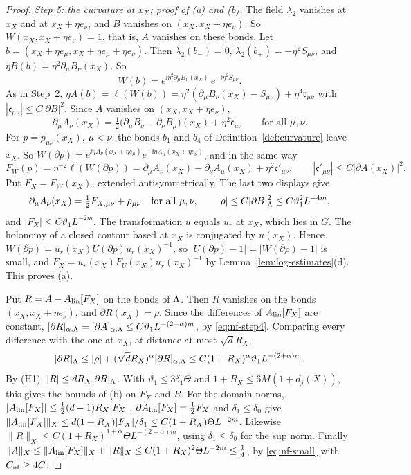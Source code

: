 \begin{proof}
\emph{Step 5: the curvature at $x_X$; proof of (a) and (b).} The field $\lambda_2$ vanishes at $x_X$ and at $x_X+\eta e_\nu$, and $B$ vanishes on $(x_X,x_X+\eta e_\nu)$. So $W(x_X,x_X+\eta e_\nu)=1$, that is, $A$ vanishes on these bonds. Let $b=(x_X+\eta e_\mu,x_X+\eta e_\mu+\eta e_\nu)$. Then $\lambda_2(b_-)=0$, $\lambda_2(b_+)=-\eta^2S_{\mu\nu}$, and $\eta B(b)=\eta^2\partial_\mu B_\nu(x_X)$. So
\[
W(b)=e^{\ii\eta^2\partial_\mu B_\nu(x_X)}\,e^{-\ii\eta^2S_{\mu\nu}} .
\]
As in Step~2, $\eta A(b)=\ell(W(b))=\eta^2(\partial_\mu B_\nu(x_X)-S_{\mu\nu})+\eta^4\mathfrak c_{\mu\nu}$ with $|\mathfrak c_{\mu\nu}|\le C|\partial B|^2$. Since $A$ vanishes on $(x_X,x_X+\eta e_\nu)$,
\[
\partial_\mu A_\nu(x_X)=\tfrac12\big(\partial_\mu B_\nu-\partial_\nu B_\mu\big)(x_X)+\eta^2\mathfrak c_{\mu\nu}\qquad\text{for all }\mu,\nu .
\]
For $p=p_{\mu\nu}(x_X)$, $\mu<\nu$, the bonds $b_1$ and $b_4$ of Definition~\ref{def:curvature} leave $x_X$. So $W(\partial p)=e^{\ii\eta A_\nu(x_X+\eta e_\mu)}e^{-\ii\eta A_\mu(x_X+\eta e_\nu)}$, and in the same way
\[
F_W(p)=\eta^{-2}\ell(W(\partial p))=\partial_\mu A_\nu(x_X)-\partial_\nu A_\mu(x_X)+\eta^2\mathfrak c'_{\mu\nu},\qquad|\mathfrak c'_{\mu\nu}|\le C|\partial A(x_X)|^2 .
\]
Put $F_X=F_W(x_X)$, extended antisymmetrically. The last two displays give
\[
\partial_\mu A_\nu(x_X)=\tfrac12F_{X,\mu\nu}+\rho_{\mu\nu}\quad\text{for all }\mu,\nu,\qquad|\rho|\le C|\partial B|_\Lambda^2\le C\vartheta_1^2L^{-4m},
\]
and $|F_X|\le C\vartheta_1L^{-2m}$. The transformation $u$ equals $u_r$ at $x_X$, which lies in $G$. The holonomy of a closed contour based at $x_X$ is conjugated by $u(x_X)$. Hence $W(\partial p)=u_r(x_X)U(\partial p)u_r(x_X)^{-1}$, so $|U(\partial p)-1|=|W(\partial p)-1|$ is small, and $F_X=u_r(x_X)F_U(x_X)u_r(x_X)^{-1}$ by Lemma~\ref{lem:log-estimates}(d). This proves (a).

Put $R=A-A_{\rm lin}[F_X]$ on the bonds of $\Lambda$. Then $R$ vanishes on the bonds $(x_X,x_X+\eta e_\nu)$, and $\partial R(x_X)=\rho$. Since the differences of $A_{\rm lin}[F_X]$ are constant, $[\partial R]_{\alpha,\Lambda}=[\partial A]_{\alpha,\Lambda}\le C\vartheta_1L^{-(2+\alpha)m}$, by \eqref{eq:nf-step4}. Comparing every difference with the one at $x_X$, at distance at most $\sqrt dR_X$,
\[
|\partial R|_\Lambda\le|\rho|+(\sqrt dR_X)^\alpha[\partial R]_{\alpha,\Lambda}\le C(1+R_X)^\alpha\vartheta_1L^{-(2+\alpha)m}.
\]
By (H1), $|R|\le dR_X|\partial R|_\Lambda$. With $\vartheta_1\le3\delta_1\Theta$ and $1+R_X\le6M(1+d_j(X))$, this gives the bounds of (b) on $F_X$ and $R$. For the domain norms, $|A_{\rm lin}[F_X]|\le\frac12(d-1)R_X|F_X|$, $\partial A_{\rm lin}[F_X]=\frac12F_X$ and $\delta_1\le\delta_0$ give $\|A_{\rm lin}[F_X]\|_X\le d(1+R_X)|F_X|/\delta_1\le C(1+R_X)\Theta L^{-2m}$. Likewise $\|R\|_X\le C(1+R_X)^{1+\alpha}\Theta L^{-(2+\alpha)m}$, using $\delta_1\le\delta_0$ for the sup norm. Finally $\|A\|_X\le\|A_{\rm lin}[F_X]\|_X+\|R\|_X\le C(1+R_X)^2\Theta L^{-2m}\le\frac14$, by \eqref{eq:nf-small} with $C_{\rm nf}\ge4C$.


\end{proof}
